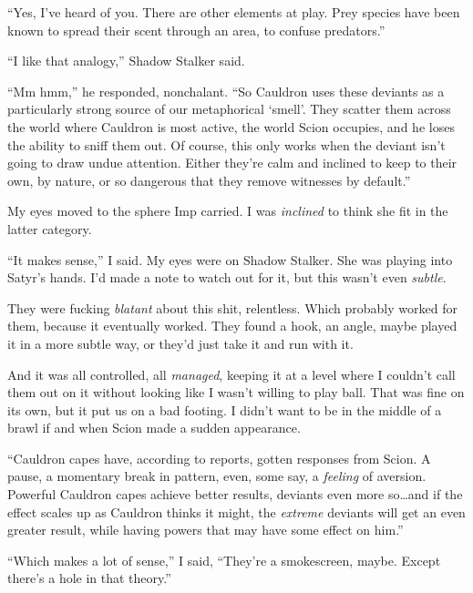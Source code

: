 ``Yes, I've heard of you.  There are other elements at play.  Prey species have been known to spread their scent through an area, to confuse predators.''



``I like that analogy,'' Shadow Stalker said.



``Mm hmm,'' he responded, nonchalant.  ``So Cauldron uses these deviants as a particularly strong source of our metaphorical `smell'.  They scatter them across the world where Cauldron is most active, the world Scion occupies, and he loses the ability to sniff them out.  Of course, this only works when the deviant isn't going to draw undue attention.  Either they're calm and inclined to keep to their own, by nature, or so dangerous that they remove witnesses by default.''



My eyes moved to the sphere Imp carried.  I was \emph{inclined} to think she fit in the latter category.



``It makes sense,'' I said.  My eyes were on Shadow Stalker.  She was playing into Satyr's hands.  I'd made a note to watch out for it, but this wasn't even \emph{subtle}.



They were fucking \emph{blatant} about this shit, relentless.  Which probably worked for them, because it eventually worked.  They found a hook, an angle, maybe played it in a more subtle way, or they'd just take it and run with it.



And it was all controlled, all \emph{managed}, keeping it at a level where I couldn't call them out on it without looking like I wasn't willing to play ball.  That was fine on its own, but it put us on a bad footing.  I didn't want to be in the middle of a brawl if and when Scion made a sudden appearance.



``Cauldron capes have, according to reports, gotten responses from Scion.  A pause, a momentary break in pattern, even, some say, a \emph{feeling} of aversion.  Powerful Cauldron capes achieve better results, deviants even more so\ldots and if the effect scales up as Cauldron thinks it might, the \emph{extreme }deviants will get an even greater result, while having powers that may have some effect on him.''



``Which makes a lot of sense,'' I said, ``They're a smokescreen, maybe.  Except there's a hole in that theory.''



